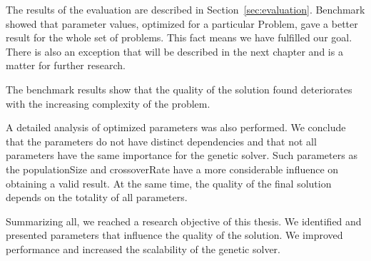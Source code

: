 The results of the evaluation are described in Section~\ref{sec:evaluation}.
Benchmark showed that parameter values, optimized for a particular Problem, gave a better result for the whole set of problems. This fact means we have fulfilled our goal. There is also an exception that will be described in the next chapter and is a matter for further research.

The benchmark results show that the quality of the solution found deteriorates with the increasing complexity of the problem.

A detailed analysis of optimized parameters was also performed. We conclude that the parameters do not have distinct dependencies and that not all parameters have the same importance for the genetic solver. Such parameters as the populationSize and crossoverRate have a more considerable influence on obtaining a valid result. At the same time, the quality of the final solution depends on the totality of all parameters.

Summarizing all, we reached a research objective of this thesis. We identified and presented parameters that influence the quality of the solution. We improved performance and increased the scalability of the genetic solver.

